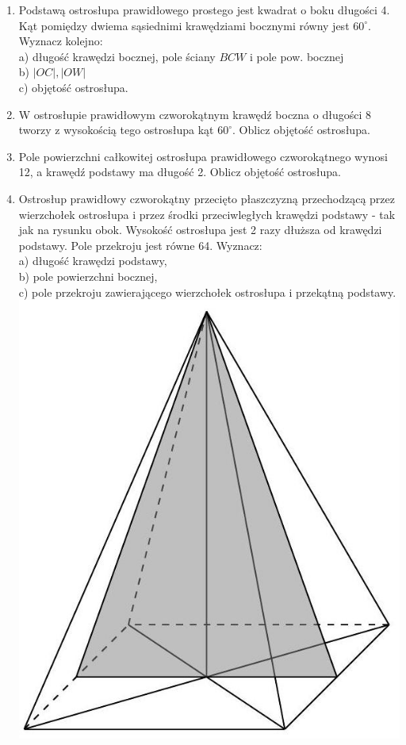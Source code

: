 \documentclass[10pt]{article}
\begin{document}
\begin{enumerate}
  \item Podstawą ostrosłupa prawidłowego prostego jest kwadrat o boku długości 4. Kąt pomiędzy dwiema sąsiednimi krawędziami bocznymi równy jest \(60^{\circ}\). Wyznacz kolejno:\\
a) długość krawędzi bocznej, pole ściany \(B C W\) i pole pow. bocznej\\
b) \(|O C|,|O W|\)\\
c) objętość ostrosłupa.
  \item W ostrosłupie prawidłowym czworokątnym krawędź boczna o długości 8 tworzy z wysokością tego ostrosłupa kąt \(60^{\circ}\). Oblicz objętość ostrosłupa.
  \item Pole powierzchni całkowitej ostrosłupa prawidłowego czworokątnego wynosi 12, a krawędź podstawy ma długość 2. Oblicz objętość ostrosłupa.
  \item Ostrosłup prawidłowy czworokątny przecięto płaszczyzną przechodzącą przez wierzchołek ostrosłupa i przez środki przeciwległych krawędzi podstawy - tak jak na rysunku obok. Wysokość ostrosłupa jest 2 razy dłuższa od krawędzi podstawy. Pole przekroju jest równe 64. Wyznacz:\\
a) długość krawędzi podstawy,\\
b) pole powierzchni bocznej,\\
c) pole przekroju zawierającego wierzchołek ostrosłupa i przekątną podstawy.\\
\includegraphics[max width=\textwidth, center]{2024_11_21_e9b4faa005d5be2cc318g-087(1)}

\end{enumerate}
\end{document}

